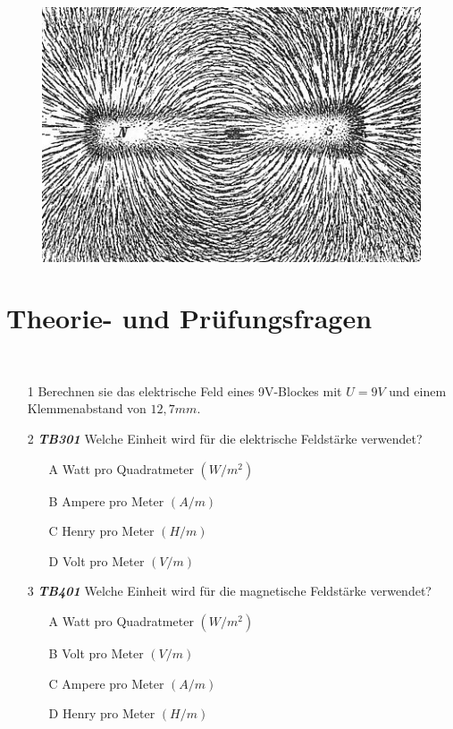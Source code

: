 \begin{figure}
 \vspace{-6cm}
  \includegraphics[scale=0.35]{Felder/Bilder/Magnet.jpg}
 \vspace{-6cm}
\end{figure}

\section{Theorie- und Prüfungsfragen}

~~~~~~
\begin{enumerate} 
\itemsep1pt\parskip0pt
\item[1] Berechnen sie das elektrische Feld eines 9V-Blockes mit $U = 9V$ und einem Klemmenabstand von $12,7mm$.
\end{enumerate}


\begin{enumerate} 
\itemsep1pt\parskip0pt
\item[2] \emph{\textbf{TB301}} Welche Einheit wird für die elektrische Feldstärke verwendet?
	\begin{enumerate}
	\itemsep1pt\parskip0pt
		\item[A] Watt pro Quadratmeter $(W/m^2)$
		\item[B] Ampere pro Meter $(A/m)$
		\item[C] Henry pro Meter $(H/m)$
		\item[D] Volt pro Meter $(V/m)$
	\end{enumerate}
\end{enumerate}

\begin{enumerate} 
\itemsep1pt\parskip0pt
\item[3] \emph{\textbf{TB401}} Welche Einheit wird für die magnetische Feldstärke verwendet?
	\begin{enumerate}
	\itemsep1pt\parskip0pt
		\item[A] Watt pro Quadratmeter $(W/m^2)$
		\item[B] Volt pro Meter $(V/m)$
		\item[C] Ampere pro Meter $(A/m)$
		\item[D] Henry pro Meter $(H/m)$
	\end{enumerate}
\end{enumerate}



